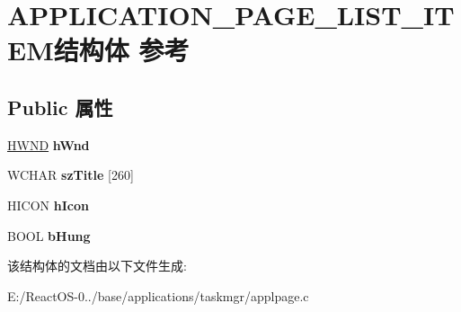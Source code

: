 \hypertarget{struct_a_p_p_l_i_c_a_t_i_o_n___p_a_g_e___l_i_s_t___i_t_e_m}{}\section{A\+P\+P\+L\+I\+C\+A\+T\+I\+O\+N\+\_\+\+P\+A\+G\+E\+\_\+\+L\+I\+S\+T\+\_\+\+I\+T\+E\+M结构体 参考}
\label{struct_a_p_p_l_i_c_a_t_i_o_n___p_a_g_e___l_i_s_t___i_t_e_m}
\subsection*{Public 属性}
\begin{DoxyCompactItemize}
\item 
\mbox{\label{struct_a_p_p_l_i_c_a_t_i_o_n___p_a_g_e___l_i_s_t___i_t_e_m_abd56deeba859282189c1797a1e35cef8}} 
\hyperlink{interfacevoid}{H\+W\+ND} {\bfseries h\+Wnd}
\item 
\mbox{\label{struct_a_p_p_l_i_c_a_t_i_o_n___p_a_g_e___l_i_s_t___i_t_e_m_a027c2f224d31b860d2d44547eb0baa58}} 
W\+C\+H\+AR {\bfseries sz\+Title} \mbox{[}260\mbox{]}
\item 
\mbox{\label{struct_a_p_p_l_i_c_a_t_i_o_n___p_a_g_e___l_i_s_t___i_t_e_m_a2b1934867fb5ed4759a4d7b8fc046aea}} 
H\+I\+C\+ON {\bfseries h\+Icon}
\item 
\mbox{\label{struct_a_p_p_l_i_c_a_t_i_o_n___p_a_g_e___l_i_s_t___i_t_e_m_a4214dfe05ef0f25a234a96f3f883e781}} 
B\+O\+OL {\bfseries b\+Hung}
\end{DoxyCompactItemize}


该结构体的文档由以下文件生成\+:\begin{DoxyCompactItemize}
\item 
E\+:/\+React\+O\+S-\/0../base/applications/taskmgr/applpage.\+c\end{DoxyCompactItemize}
